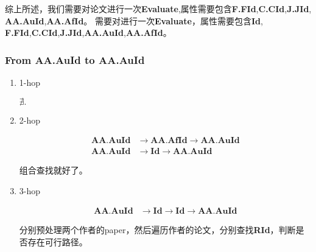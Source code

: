 \documentclass[hyperref,UTF8]{ctexart}
\theoremstyle{definition}
\theoremstyle{remark}
\numberwithin{equation}{subsection}
\newcommand{\Emph}{\textbf}
\newcommand{\Evaluate}{\Emph{Evaluate}}
\newcommand{\Id}{\Emph{Id}}
\newcommand{\RId}{\Emph{RId}}
\newcommand{\FFId}{\Emph{F.FId}}
\newcommand{\CCId}{\Emph{C.CId}}
\newcommand{\JJId}{\Emph{J.JId}}
\newcommand{\AAAuId}{\Emph{AA.AuId}}
\newcommand{\AAAfId}{\Emph{AA.AfId}}
\begin{document}
	综上所述，我们需要对论文进行一次\Evaluate,属性需要包含\FFId,\CCId,\JJId,
    \AAAuId,\AAAfId。
	需要对进行一次\Evaluate，属性需要包含\Id, \FFId,\CCId,\JJId,\AAAuId,\AAAfId。
	
\subsubsection{From \Emph{AA.AuId} to \Emph{AA.AuId}}

	\begin{enumerate}[(1)]
	
		\item 1-hop
		
		$\nexists.$
		
		\item 2-hop
		
		\begin{align}
			\AAAuId &\rightarrow \AAAfId \rightarrow \AAAuId	\\
			\AAAuId &\rightarrow \Id	\rightarrow \AAAuId
		\end{align}
		
		组合查找就好了。
		
		\item 3-hop
		
		\begin{align}
			\AAAuId &\rightarrow \Id \rightarrow \Id \rightarrow \AAAuId
		\end{align}
		
		分别预处理两个作者的paper，然后遍历作者的论文，分别查找\RId，判断是否存在可行路径。
		
	\end{enumerate}
	
\end{document}
